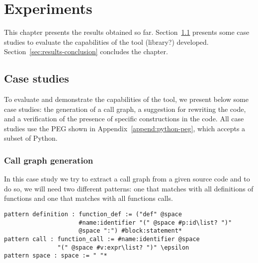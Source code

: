 \chapter{Experiments}\label{chap:results}

This chapter presents the results obtained so far. Section~\ref{sec:case-studies}
presents some case studies to evaluate the capabilities of the tool (library?) developed.
Section~\ref{sec:results-conclusion} concludes the chapter.

\section{Case studies}\label{sec:case-studies}

To evaluate and demonstrate the capabilities of the tool, we present below
some case studies: the generation of a call graph, a suggestion for rewriting
the code, and a verification of the presence of specific constructions in the
code. All case studies use the PEG shown in Appendix~\ref{append:python-peg},
which accepts a subset of Python.

\subsection{Call graph generation}

In this case study we try to extract a call graph from a given source code
and to do so, we will need two different patterns: one that matches with all
definitions of functions and one that matches with all functions calls.

\begin{verbatim}
pattern definition : function_def := ("def" @space
                     #name:identifier "(" @space #p:id\list? ")"
                     @space ":") #block:statement*
pattern call : function_call := #name:identifier @space
               "(" @space #v:expr\list? ")" \epsilon
pattern space : space := " "*
\end{verbatim}


